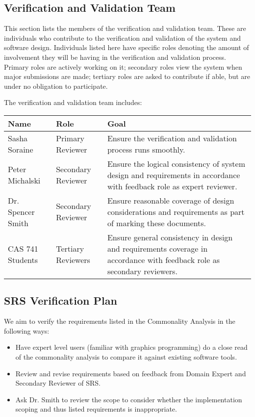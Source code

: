 \documentclass[12pt, titlepage]{article}
\begin{document}
\subsection{Verification and Validation Team}
This section lists the members of the verification and validation team. These 
are individuals who contribute to the verification and validation of the system 
and software design. Individuals listed here have specific roles denoting the 
amount of involvement they will be having in the verification and validation 
process. Primary roles are actively working on it; secondary roles view the 
system when major submissions are made; tertiary roles are asked to contribute 
if able, but are under no obligation to participate.

The verification and validation team includes:

\begin{table}[h]
	\begin{tabular}{|l|l|p{9cm}|}
		\hline
		\textbf{Name} & \textbf{Role} & \textbf{Goal} \\
		\hline
		Sasha Soraine & Primary Reviewer& Ensure the verification and 
		validation 
		process runs smoothly.\\
		Peter Michalski & Secondary Reviewer& Ensure the logical consistency of 
		system 
		design and requirements in accordance with feedback role as expert 
		reviewer. \\
		Dr. Spencer Smith & Secondary Reviewer& Ensure reasonable coverage of 
		design 
		considerations and requirements as part of marking these documents. \\
		CAS 741 Students & Tertiary Reviewers& Ensure general consistency in 
		design and 
		requirements coverage in accordance with feedback role as secondary 
		reviewers.\\
		\hline
	\end{tabular}
\end{table}

\subsection{SRS Verification Plan}

We aim to verify the requirements listed in the Commonality Analysis in the 
following ways:

\begin{itemize}
	\item Have expert level users (familiar with graphics programming) do a 
	close read of the commonality analysis to compare it against existing 
	software tools.
	\item Review and revise requirements based on feedback from Domain Expert 
	and Secondary Reviewer of SRS.
	\item Ask Dr. Smith to review the scope to consider whether the 
	implementation scoping and thus listed requirements is inappropriate.
\end{itemize}
\end{document}
